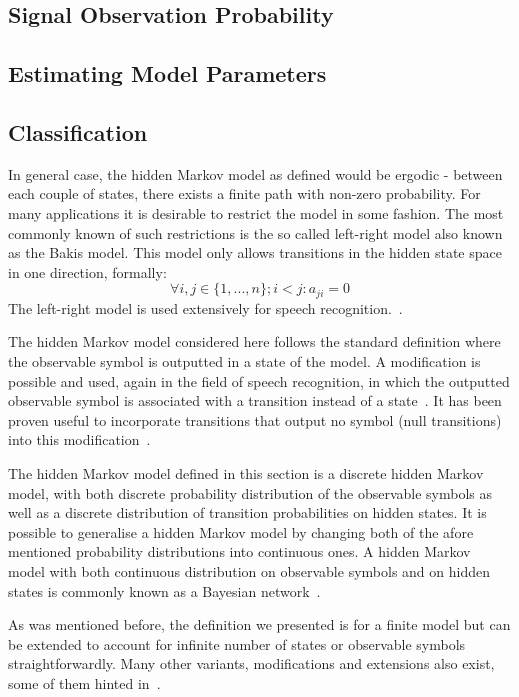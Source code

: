 \subsection{Signal Observation Probability}

\subsection{Estimating Model Parameters}

\subsection{Classification}

In general case, the hidden Markov model as defined would be ergodic - between each couple of states, there exists a finite path with non-zero probability. For many applications it is desirable to restrict the model in some fashion. The most commonly known of such restrictions is the so called left-right model also known as the Bakis model. This model only allows transitions in the hidden state space in one direction, formally: $$\forall i,j \in \{1, ..., n\}; i < j: a_{ji} = 0$$
The left-right model is used extensively for speech recognition.~\cite{bakis1976, jelinek1976}.

The hidden Markov model considered here follows the standard definition where the observable symbol is outputted in a state of the model. A modification is possible and used, again in the field of speech recognition, in which the outputted observable symbol is associated with a transition instead of a state~\cite{Rabiner89hmm, jelinek1983}. It has been proven useful to incorporate transitions that output no symbol (null transitions) into this modification~\cite{jelinek1983}.

The hidden Markov model defined in this section is a discrete hidden Markov model, with both discrete probability distribution of the observable symbols as well as a discrete distribution of transition probabilities on hidden states. It is possible to generalise a hidden Markov model by changing both of the afore mentioned probability distributions into continuous ones. A hidden Markov model with both continuous distribution on observable symbols and on hidden states is commonly known as a Bayesian network~\cite{ben-gal2007bn}.

As was mentioned before, the definition we presented is for a finite model but can be extended to account for infinite number of states or observable symbols straightforwardly. Many other variants, modifications and extensions also exist, some of them hinted in~\cite{Rabiner89hmm}.




